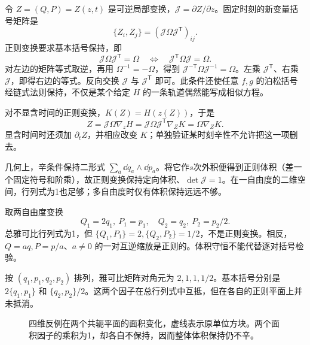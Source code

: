 令 $Z=(Q,P)=Z(z,t)$ 是可逆局部变换，$\mathcal J=\partial Z/\partial z$。固定时刻的新变量括号矩阵是
\[
\{Z_i,Z_j\}=(\mathcal J\Omega\mathcal J^{\mathsf T})_{ij}.
\]
正则变换要求基本括号保持，即
\begin{equation}
\mathcal J\Omega\mathcal J^{\mathsf T}=\Omega
\quad\Longleftrightarrow\quad
\mathcal J^{\mathsf T}\Omega\mathcal J=\Omega.
\label{eq:symplectic-condition}
\end{equation}
对左边的矩阵等式取逆，再用 $\Omega^{-1}=-\Omega$，得到 $\mathcal J^{-\mathsf T}\Omega\mathcal J^{-1}=\Omega$。左乘 $\mathcal J^{\mathsf T}$、右乘 $\mathcal J$，即得右边的等式。反向交换 $\mathcal J$ 与 $\mathcal J^{\mathsf T}$ 即可。此条件还使任意 $f,g$ 的泊松括号经链式法则保持，不仅是某个给定 $H$ 的一条轨道偶然能写成相似方程。

对不显含时间的正则变换，$K(Z)=H(z(Z))$，于是
\[
\dot Z=\mathcal J\Omega\nabla_zH
=\mathcal J\Omega\mathcal J^{\mathsf T}\nabla_ZK=\Omega\nabla_ZK.
\]
显含时间时还须加 $\partial_tZ$，并相应改变 $K$；单独验证某时刻辛性不允许把这一项删去。

几何上，辛条件保持二形式 $\sum_a\dd q_a\wedge\dd p_a$。将它作$s$次外积便得到正则体积（差一个固定符号和阶乘），故正则变换保持定向体积、$\det\mathcal J=1$。在一自由度的二维空间，行列式为1也足够；多自由度时仅有体积保持远远不够。

\begin{example}[四维体积保持的反例]
取两自由度变换
\[
Q_1=2q_1,\ P_1=p_1,\quad Q_2=q_2,\ P_2=p_2/2.
\]
总雅可比行列式为1，但 $\{Q_1,P_1\}=2,\{Q_2,P_2\}=1/2$，不是正则变换。相反，$Q=aq,P=p/a$、$a\ne0$ 的一对互逆缩放是正则的。体积守恒不能代替逐对括号检验。

按 $(q_1,p_1,q_2,p_2)$ 排列，雅可比矩阵对角元为 $2,1,1,1/2$。基本括号分别是 $2\{q_1,p_1\}$ 和 $\{q_2,p_2\}/2$。这两个因子在总行列式中互抵，但在各自的正则平面上并未抵消。
\end{example}

\begin{figure}[htbp]
\centering
{}
\caption{四维反例在两个共轭平面的面积变化，虚线表示原单位方块。两个面积因子的乘积为1，却各自不保持，因而整体体积保持仍不辛。}
\label{fig:ham-volume-not-symplectic}
\end{figure}

